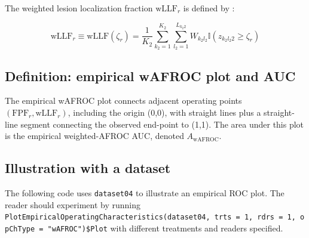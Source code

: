 \documentclass[
]{book}
\newenvironment{Shaded}{\begin{snugshade}}{\end{snugshade}}
\newcommand{\DataTypeTok}[1]{\textcolor[rgb]{0.13,0.29,0.53}{#1}}
\newcommand{\DecValTok}[1]{\textcolor[rgb]{0.00,0.00,0.81}{#1}}
\newcommand{\KeywordTok}[1]{\textcolor[rgb]{0.13,0.29,0.53}{\textbf{#1}}}
\newcommand{\NormalTok}[1]{#1}
\newcommand{\OperatorTok}[1]{\textcolor[rgb]{0.81,0.36,0.00}{\textbf{#1}}}
\newcommand{\StringTok}[1]{\textcolor[rgb]{0.31,0.60,0.02}{#1}}
\begin{document}
The weighted lesion localization fraction \(\text{wLLF}_r\) is defined by \citep{RN2484}:

\begin{equation}
\text{wLLF}_r \equiv \text{wLLF}\left ( \zeta_r \right ) = \frac{1}{K_2}\sum_{k_2=1}^{K_2}\sum_{l_2=1}^{L_{k_2 2}}W_{k_2 l_2} \mathbb{I}\left ( z_{k_2 l_2 2} \geq \zeta_r \right )
\label{eq:empirical-wLLFr}
\end{equation}

\hypertarget{empirical-definition-empirical-auc-wafroc}{%
\subsection{Definition: empirical wAFROC plot and AUC}\label{empirical-definition-empirical-auc-wafroc}}

The empirical wAFROC plot connects adjacent operating points \(\left ( \text{FPF}_r, \text{wLLF}_r \right )\), including the origin (0,0), with straight lines plus a straight-line segment connecting the observed end-point to (1,1). The area under this plot is the empirical weighted-AFROC AUC, denoted \(A_{\text{wAFROC}}\).

\hypertarget{empirical-wafroc-plot-illustration}{%
\subsection{Illustration with a dataset}\label{empirical-wafroc-plot-illustration}}

The following code uses \texttt{dataset04} to illustrate an empirical ROC plot. The reader should experiment by running \texttt{PlotEmpiricalOperatingCharacteristics(dataset04,\ trts\ =\ 1,\ rdrs\ =\ 1,\ opChType\ =\ "wAFROC")\$Plot} with different treatments and readers specified.

\begin{Shaded}
\end{Shaded}
\end{document}
